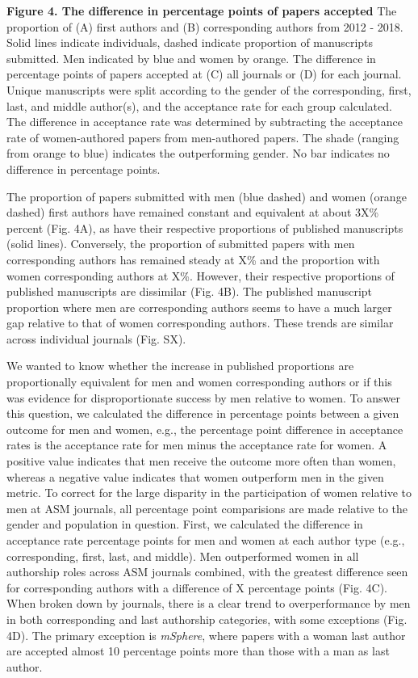 \documentclass[11pt,]{article}
\begin{document}
\textbf{Figure 4. The difference in percentage points of papers
accepted} The proportion of (A) first authors and (B) corresponding
authors from 2012 - 2018. Solid lines indicate individuals, dashed
indicate proportion of manuscripts submitted. Men indicated by blue and
women by orange. The difference in percentage points of papers accepted
at (C) all journals or (D) for each journal. Unique manuscripts were
split according to the gender of the corresponding, first, last, and
middle author(s), and the acceptance rate for each group calculated. The
difference in acceptance rate was determined by subtracting the
acceptance rate of women-authored papers from men-authored papers. The
shade (ranging from orange to blue) indicates the outperforming gender.
No bar indicates no difference in percentage points.

The proportion of papers submitted with men (blue dashed) and women
(orange dashed) first authors have remained constant and equivalent at
about 3X\% percent (Fig. 4A), as have their respective proportions of
published manuscripts (solid lines). Conversely, the proportion of
submitted papers with men corresponding authors has remained steady at
X\% and the proportion with women corresponding authors at X\%. However,
their respective proportions of published manuscripts are dissimilar
(Fig. 4B). The published manuscript proportion where men are
corresponding authors seems to have a much larger gap relative to that
of women corresponding authors. These trends are similar across
individual journals (Fig. SX).

We wanted to know whether the increase in published proportions are
proportionally equivalent for men and women corresponding authors or if
this was evidence for disproportionate success by men relative to women.
To answer this question, we calculated the difference in percentage
points between a given outcome for men and women, e.g., the percentage
point difference in acceptance rates is the acceptance rate for men
minus the acceptance rate for women. A positive value indicates that men
receive the outcome more often than women, whereas a negative value
indicates that women outperform men in the given metric. To correct for
the large disparity in the participation of women relative to men at ASM
journals, all percentage point comparisions are made relative to the
gender and population in question. First, we calculated the difference
in acceptance rate percentage points for men and women at each author
type (e.g., corresponding, first, last, and middle). Men outperformed
women in all authorship roles across ASM journals combined, with the
greatest difference seen for corresponding authors with a difference of
X percentage points (Fig. 4C). When broken down by journals, there is a
clear trend to overperformance by men in both corresponding and last
authorship categories, with some exceptions (Fig. 4D). The primary
exception is \emph{mSphere}, where papers with a woman last author are
accepted almost 10 percentage points more than those with a man as last
author.
\end{document}
